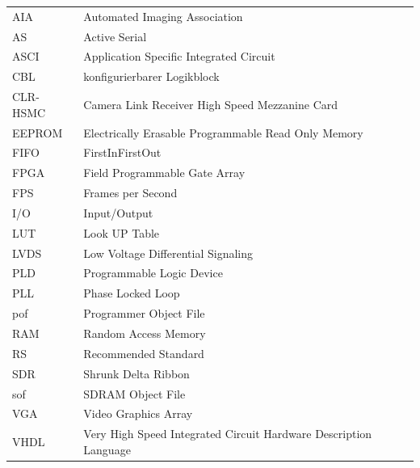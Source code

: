 \documentclass[ngerman,12pt]{article} %
\begin{document}
\begin{tabular}{@{\bf}ll}
	AIA	&Automated Imaging Association\\
	AS	&Active Serial\\
	ASCI	&Application Specific Integrated Circuit\\
	CBL	& konfigurierbarer Logikblock\\
	CLR-HSMC	&Camera Link Receiver High Speed Mezzanine Card\\ 
	EEPROM	& Electrically Erasable Programmable Read Only Memory\\
	FIFO	&FirstInFirstOut\\
	FPGA	&Field Programmable Gate Array \\
	FPS	&Frames per Second\\
	I/O	&Input/Output\\
	LUT	&Look UP Table\\
	LVDS	&Low Voltage Differential Signaling\\
	PLD	&Programmable Logic Device\\
	PLL	&Phase Locked Loop\\
	pof	&Programmer Object File\\
	RAM	&Random Access Memory\\
 	RS	&Recommended Standard\\
	SDR 	&Shrunk Delta Ribbon\\
	sof	&SDRAM Object File\\
	VGA	&Video Graphics Array\\
	VHDL	&Very High Speed Integrated Circuit Hardware Description Language \\
\end{tabular}
\clearpage





\lhead{\leftmark}

\end{document}
